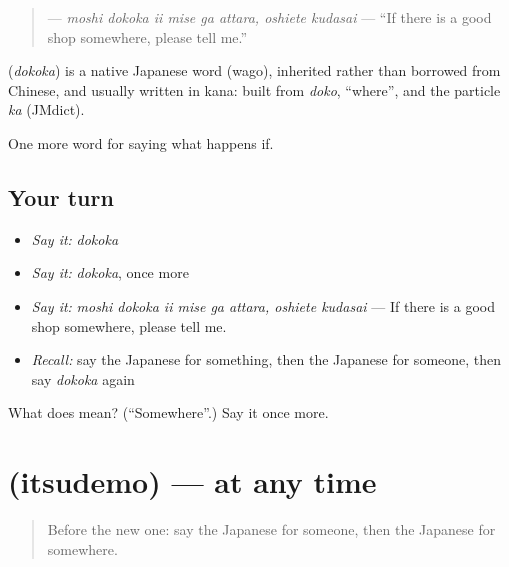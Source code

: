 \begin{quote}
\textbf{     } — \emph{moshi dokoka ii mise ga attara, oshiete kudasai} — \textquotedblleft{}If there is a good shop somewhere, please tell me.\textquotedblright{}
\end{quote}

\begin{cousinweb}
\textbf{} (\emph{dokoka}) is a native Japanese word (wago), inherited rather than borrowed from Chinese, and usually written in kana: built from \emph{doko}, \textquotedblleft{}where\textquotedblright{}, and the particle \emph{ka} (JMdict).
\end{cousinweb}

\begin{grammarlens}[title={What you've built}]
One more word for saying what happens if.
\end{grammarlens}

\subsection*{Your turn}
\begin{itemize}
\raggedright
  \item \emph{Say it:} \emph{dokoka}
  \item \emph{Say it:} \emph{dokoka}, once more
  \item \emph{Say it:} \emph{moshi dokoka ii mise ga attara, oshiete kudasai} — If there is a good shop somewhere, please tell me.
  \item \emph{Recall:} say the Japanese for something, then the Japanese for someone, then say \emph{dokoka} again
\end{itemize}

\begin{tcolorbox}[breakable,colback=teal!4,colframe=teal!35!black,title={Before you move on}]
What does  mean? (\textquotedblleft{}Somewhere\textquotedblright{}.) Say it once more.
\end{tcolorbox}
\section[\texorpdfstring{\ja{いつでも} (itsudemo)}{いつでも (itsudemo)}]{ (itsudemo) — at any time}

\label{lesson:JA-C522-itsudemo}



\begin{quote}
Before the new one: say the Japanese for someone, then the Japanese for somewhere.
\end{quote}

